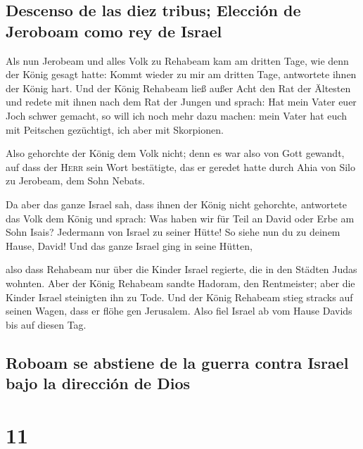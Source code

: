 \hypertarget{descenso-de-las-diez-tribus-elecciuxf3n-de-jeroboam-como-rey-de-israel}{%
\subsection{Descenso de las diez tribus; Elección de Jeroboam como rey
de
Israel}\label{descenso-de-las-diez-tribus-elecciuxf3n-de-jeroboam-como-rey-de-israel}}

 Als nun Jerobeam und alles Volk zu Rehabeam kam am
dritten Tage, wie denn der König gesagt hatte: Kommt wieder zu mir am
dritten Tage,  antwortete ihnen der König hart. Und der
König Rehabeam ließ außer Acht den Rat der Ältesten  und
redete mit ihnen nach dem Rat der Jungen und sprach: Hat mein Vater euer
Joch schwer gemacht, so will ich noch mehr dazu machen: mein Vater hat
euch mit Peitschen gezüchtigt, ich aber mit Skorpionen.

 Also gehorchte der König dem Volk nicht; denn es war
also von Gott gewandt, auf dass der \textsc{Herr} sein Wort bestätigte,
das er geredet hatte durch Ahia von Silo zu Jerobeam, dem Sohn Nebats.

 Da aber das ganze Israel sah, dass ihnen der König nicht
gehorchte, antwortete das Volk dem König und sprach: Was haben wir für
Teil an David oder Erbe am Sohn Isais? Jedermann von Israel zu seiner
Hütte! So siehe nun du zu deinem Hause, David! Und das ganze Israel ging
in seine Hütten,

 also dass Rehabeam nur über die Kinder Israel regierte,
die in den Städten Judas wohnten.  Aber der König
Rehabeam sandte Hadoram, den Rentmeister; aber die Kinder Israel
steinigten ihn zu Tode. Und der König Rehabeam stieg stracks auf seinen
Wagen, dass er flöhe gen Jerusalem.  Also fiel Israel ab
vom Hause Davids bis auf diesen Tag.

\hypertarget{roboam-se-abstiene-de-la-guerra-contra-israel-bajo-la-direcciuxf3n-de-dios}{%
\subsection{Roboam se abstiene de la guerra contra Israel bajo la
dirección de
Dios}\label{roboam-se-abstiene-de-la-guerra-contra-israel-bajo-la-direcciuxf3n-de-dios}}

\hypertarget{section-10}{%
\section{11}\label{section-10}}


